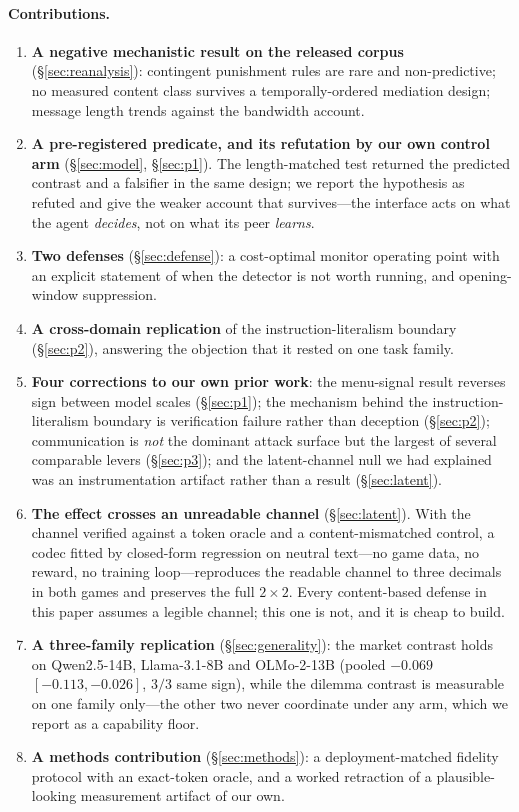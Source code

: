 \paragraph{Contributions.}
\begin{enumerate}[leftmargin=1.4em,itemsep=2pt,topsep=2pt]
\item \textbf{A negative mechanistic result on the released corpus} (\S\ref{sec:reanalysis}):
contingent punishment rules are rare and non-predictive; no measured content class
survives a temporally-ordered mediation design; message length trends against the
bandwidth account.
\item \textbf{A pre-registered predicate, and its refutation by our own control arm}
(\S\ref{sec:model}, \S\ref{sec:p1}). The length-matched test returned the predicted
contrast and a falsifier in the same design; we report the hypothesis as refuted and
give the weaker account that survives---the interface acts on what the agent
\emph{decides}, not on what its peer \emph{learns}.
\item \textbf{Two defenses} (\S\ref{sec:defense}): a cost-optimal monitor operating
point with an explicit statement of when the detector is not worth running, and
opening-window suppression.
\item \textbf{A cross-domain replication} of the instruction-literalism boundary
(\S\ref{sec:p2}), answering the objection that it rested on one task family.
\item \textbf{Four corrections to our own prior work}: the menu-signal result reverses
sign between model scales (\S\ref{sec:p1}); the mechanism behind the
instruction-literalism boundary is verification failure rather than deception
(\S\ref{sec:p2}); communication is \emph{not} the dominant attack surface but the
largest of several comparable levers (\S\ref{sec:p3}); and the latent-channel null we
had explained was an instrumentation artifact rather than a result
(\S\ref{sec:latent}).
\item \textbf{The effect crosses an unreadable channel} (\S\ref{sec:latent}). With the
channel verified against a token oracle and a content-mismatched control, a codec
fitted by closed-form regression on neutral text---no game data, no reward, no training
loop---reproduces the readable channel to three decimals in both games and preserves
the full $2\times2$. Every content-based defense in this paper assumes a legible
channel; this one is not, and it is cheap to build.
\item \textbf{A three-family replication} (\S\ref{sec:generality}): the market contrast
holds on Qwen2.5-14B, Llama-3.1-8B and OLMo-2-13B (pooled $-0.069$ $[-0.113,-0.026]$,
$3/3$ same sign), while the dilemma contrast is measurable on one family only---the
other two never coordinate under any arm, which we report as a capability floor.
\item \textbf{A methods contribution} (\S\ref{sec:methods}): a deployment-matched
fidelity protocol with an exact-token oracle, and a worked retraction of a
plausible-looking measurement artifact of our own.
\end{enumerate}

